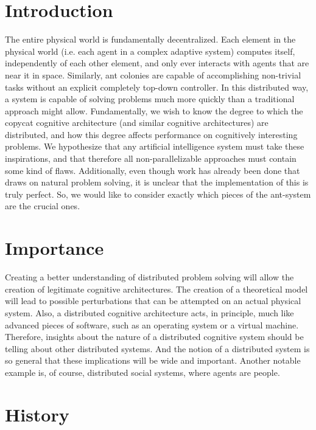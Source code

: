 \documentclass{nature}
\begin{document}
\section{Introduction}

    The entire physical world is fundamentally decentralized. 
    Each element in the physical world (i.e. each agent in a complex adaptive system) computes itself, independently of each other element, and only ever interacts with agents that are near it in space. 
    Similarly, ant colonies are capable of accomplishing non-trivial tasks without an explicit completely top-down controller.
    In this distributed way, a system is capable of solving problems much more quickly than a traditional approach might allow.
    Fundamentally, we wish to know the degree to which the copycat cognitive architecture (and similar cognitive architectures) are distributed, and how this degree affects performance on cognitively interesting problems.
    We hypothesize that any artificial intelligence system must take these inspirations, and that therefore all non-parallelizable approaches must contain some kind of flaws.
    Additionally, even though work has already been done that draws on natural problem solving, it is unclear that the implementation of this is truly perfect.
    So, we would like to consider exactly which pieces of the ant-system are the crucial ones. 

\section{Importance}

    Creating a better understanding of distributed problem solving will allow the creation of legitimate cognitive architectures. 
    The creation of a theoretical model will lead to possible perturbations that can be attempted on an actual physical system.
    Also, a distributed cognitive architecture acts, in principle, much like advanced pieces of software, such as an operating system or a virtual machine.
    Therefore, insights about the nature of a distributed cognitive system should be telling about other distributed systems. 
    And the notion of a distributed system is so general that these implications will be wide and important.
    Another notable example is, of course, distributed social systems, where agents are people.

\section{History}
\end{document}
